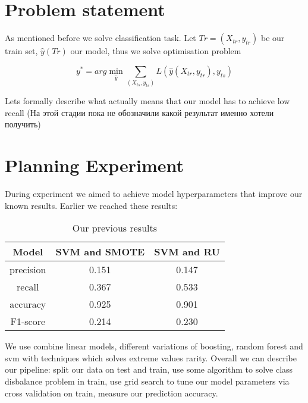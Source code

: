 \documentclass{article}
\begin{document}
\section{Problem statement}
As mentioned before we solve classification task. Let $Tr = (X_{tr}, y_{tr})$ be our train set, $\widehat{y}(Tr)$ our model, thus we solve optimisation problem 

$$y^* = arg \min\limits_{\widehat{y}} \sum \limits _{(X_{ts}, y_{ts})} L(\widehat{y}(X_{tr}, y_{tr}), y_{ts})$$

Lets formally describe what actually means that our model has to achieve low recall (На этой стадии пока не обозначили какой результат именно хотели получить)

\section{Planning Experiment}
During experiment we aimed to achieve model hyperparameters that improve our known results. Earlier we reached these results:

\begin{wraptable}{r}{0.5\linewidth}
		\begin{tabular}{|c|c|c|}
			\hline
			Model & SVM and SMOTE & SVM and RU \\ \hline
			precision &  0.151 & 0.147 \\ \hline
			recall & 0.367 & 0.533  \\ \hline
			accuracy & 0.925 & 0.901  \\ \hline
			F1-score &  0.214 & 0.230 \\ \hline
		\end{tabular}
		\caption{Our previous results}
\end{wraptable}We use combine linear models, different variations of boosting, random forest and svm with techniques which solves extreme values rarity. Overall we can describe our pipeline: split our data on test and train, use some algorithm to solve class disbalance problem in train, use grid search to tune our model parameters via cross validation on train, measure our prediction accuracy.
\end{document}
